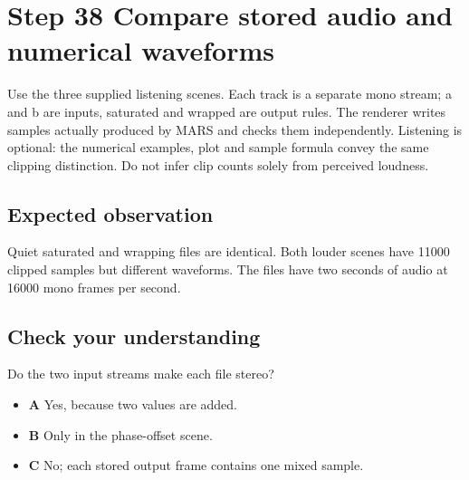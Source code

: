 \section{Step 38 Compare stored audio and numerical waveforms}\label{pcm-s38}

Use the three supplied listening scenes. Each track is a separate mono stream; a and b are inputs, saturated and wrapped are output rules. The renderer writes samples actually produced by MARS and checks them independently. Listening is optional: the numerical examples, plot and sample formula convey the same clipping distinction. Do not infer clip counts solely from perceived loudness.

\subsection{Expected observation}
Quiet saturated and wrapping files are identical. Both louder scenes have 11000 clipped samples but different waveforms. The files have two seconds of audio at 16000 mono frames per second.

\subsection{Check your understanding}
Do the two input streams make each file stereo?

\begin{itemize}
\item \textbf{A} Yes, because two values are added.
\item \textbf{B} Only in the phase-offset scene.
\item \textbf{C} No; each stored output frame contains one mixed sample.
\end{itemize}
